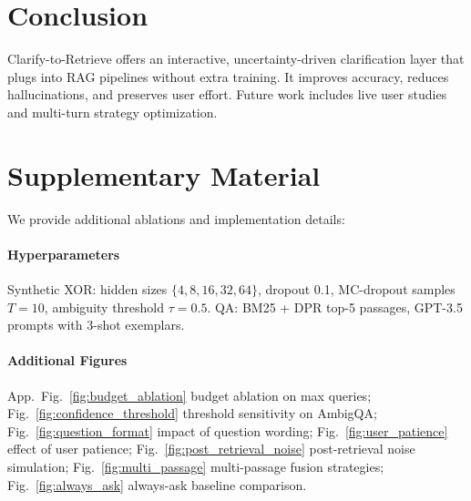 \documentclass{article}
\begin{document}
\section{Conclusion}
Clarify-to-Retrieve offers an interactive, uncertainty-driven clarification layer that plugs into RAG pipelines without extra training. It improves accuracy, reduces hallucinations, and preserves user effort. Future work includes live user studies and multi-turn strategy optimization.




\appendix
\section*{Supplementary Material}
We provide additional ablations and implementation details:

\paragraph{Hyperparameters}
Synthetic XOR: hidden sizes $\{4,8,16,32,64\}$, dropout 0.1, MC-dropout samples $T=10$, ambiguity threshold $\tau=0.5$. QA: BM25 \cite{robertson2009thepr} + DPR \cite{karpukhin2020densepr} top-5 passages, GPT-3.5 prompts with 3-shot exemplars.

\paragraph{Additional Figures}
App.~Fig.~\ref{fig:budget_ablation} budget ablation on max queries; Fig.~\ref{fig:confidence_threshold} threshold sensitivity on AmbigQA; Fig.~\ref{fig:question_format} impact of question wording; Fig.~\ref{fig:user_patience} effect of user patience; Fig.~\ref{fig:post_retrieval_noise} post-retrieval noise simulation; Fig.~\ref{fig:multi_passage} multi-passage fusion strategies; Fig.~\ref{fig:always_ask} always-ask baseline comparison.
\end{document}
